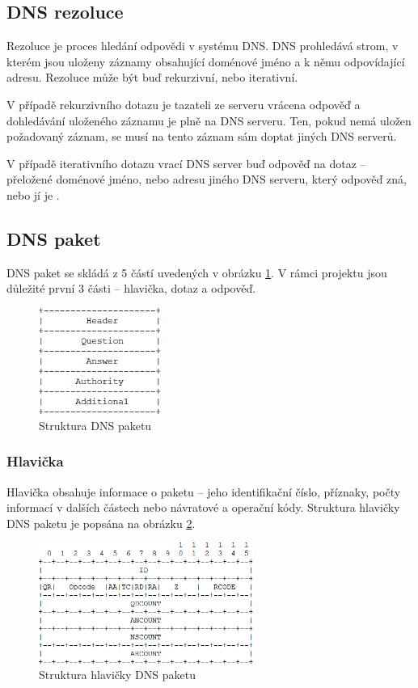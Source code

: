 \documentclass[a4paper, 11pt]{article}
\begin{document}
	\subsection{DNS rezoluce}
	Rezoluce je proces hledání odpovědi v systému DNS. DNS prohledává strom, v kterém jsou uloženy záznamy obsahující doménové jméno a k němu odpovídající adresu. Rezoluce může být buď rekurzivní, nebo iterativní.
	
	V případě rekurzivního dotazu je tazateli ze serveru vrácena odpověď a dohledávání uloženého záznamu je plně na DNS serveru. Ten, pokud nemá uložen požadovaný záznam, se musí na tento záznam sám doptat jiných DNS serverů.
	
	V případě iterativního dotazu vrací DNS server buď odpověď na dotaz -- přeložené doménové jméno, nebo adresu jiného DNS serveru, který odpověď zná, nebo jí je . 
	
	\subsection{DNS paket}
	DNS paket se skládá z 5 částí uvedených v obrázku \ref{fig:1}. V rámci projektu jsou důležité první 3 části -- hlavička, dotaz a odpověď. 
	\begin{figure}[h]
		\includegraphics[width=4cm]{dnspacket.png}
		\centering
		\caption{Struktura DNS paketu}
		\label{fig:1}
	\end{figure}

	\newpage

	\subsubsection{Hlavička}
	Hlavička obsahuje informace o paketu -- jeho identifikační číslo, příznaky, počty informací v dalších částech nebo návratové a operační kódy. Struktura hlavičky DNS paketu je popsána na obrázku \ref{fig:2}.

	\begin{figure}[h]
		\includegraphics[width=7cm]{dnsheader.png}
		\centering
		\caption{Struktura hlavičky DNS paketu}
		\label{fig:2}
	\end{figure}
	
\end{document}
